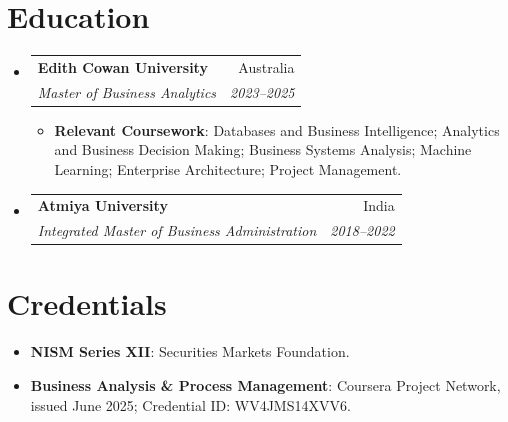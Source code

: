 \documentclass[letterpaper,9.5pt]{article}
\makeatletter
\newcommand{\resumeItem}[2]{
  \item\small{
    \textbf{#1}{: #2 \vspace{-2pt}}
  }
}
\newcommand{\resumeSubheading}[4]{
  \vspace{-1pt}\item
    \begin{tabular*}{0.97\textwidth}{l@{\extracolsep{\fill}}r}
      \textbf{#1} & #2 \\
      \textit{\small #3} & \textit{\small #4} \\
    \end{tabular*}\vspace{-5pt}
}
\newcommand{\resumeSubItem}[2]{\resumeItem{#1}{#2}\vspace{-4pt}}
\newcommand{\resumeSubHeadingListStart}{\begin{itemize}[leftmargin=*]}
\newcommand{\resumeSubHeadingListEnd}{\end{itemize}}
\newcommand{\resumeItemListStart}{\begin{itemize}}
\newcommand{\resumeItemListEnd}{\end{itemize}\vspace{-5pt}}
\makeatother
\begin{document}
\section{Education}
\resumeSubHeadingListStart
  \resumeSubheading
    {Edith Cowan University}{Australia}
    {Master of Business Analytics}{2023--2025}
    \resumeItemListStart
      \resumeItem{Relevant Coursework}
        {Databases and Business Intelligence; Analytics and Business Decision Making; Business Systems Analysis; Machine Learning; Enterprise Architecture; Project Management.}
    \resumeItemListEnd
  \resumeSubheading
    {Atmiya University}{India}
    {Integrated Master of Business Administration}{2018--2022}
\resumeSubHeadingListEnd

\section{Credentials}
\vspace{-2pt}
\resumeSubHeadingListStart
  \resumeSubItem{NISM Series XII}
    {Securities Markets Foundation.}
  \resumeSubItem{Business Analysis \& Process Management}
    {Coursera Project Network, issued June 2025; Credential ID: WV4JMS14XVV6.}
\resumeSubHeadingListEnd
\end{document}

